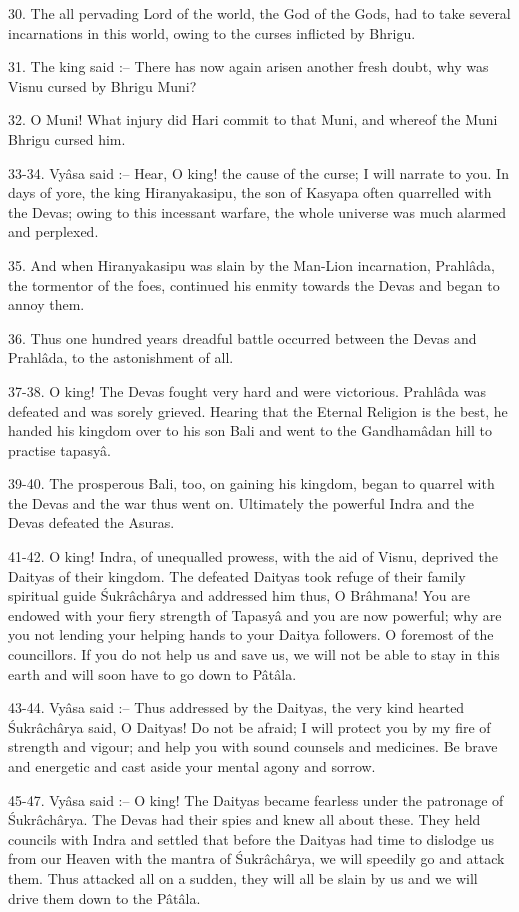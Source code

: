 30. The all pervading Lord of the world, the God of the Gods, had to take several incarnations in this world, owing to the curses inflicted by Bhrigu.

31. The king said :-- There has now again arisen another fresh doubt, why was Visnu cursed by Bhrigu Muni?

32. O Muni! What injury did Hari commit to that Muni, and whereof the Muni Bhrigu cursed him.

33-34. Vy\^asa said :-- Hear, O king! the cause of the curse; I will narrate to you. In days of yore, the king Hiranyakasipu, the son of Kasyapa often quarrelled with the Devas; owing to this incessant warfare, the whole universe was much alarmed and perplexed.

35. And when Hiranyakasipu was slain by the Man-Lion incarnation, Prahl\^ada, the tormentor of the foes, continued his enmity towards the Devas and began to annoy them.

36. Thus one hundred years dreadful battle occurred between the Devas and Prahl\^ada, to the astonishment of all.

37-38. O king! The Devas fought very hard and were victorious. Prahl\^ada was defeated and was sorely grieved. Hearing that the Eternal Religion is the best, he handed his kingdom over to his son Bali and went to the Gandham\^adan hill to practise tapasy\^a.

39-40. The prosperous Bali, too, on gaining his kingdom, began to quarrel with the Devas and the war thus went on. Ultimately the powerful Indra and the Devas defeated the Asuras.

41-42. O king! Indra, of unequalled prowess, with the aid of Visnu, deprived the Daityas of their kingdom. The defeated Daityas took refuge of their family spiritual guide \'Sukr\^ach\^arya and addressed him thus, O Br\^ahmana! You are endowed with your fiery strength of Tapasy\^a and you are now powerful; why are you not lending your helping hands to your Daitya followers. O foremost of the councillors. If you do not help us and save us, we will not be able to stay in this earth and will soon have to go down to P\^at\^ala.

43-44. Vy\^asa said :-- Thus addressed by the Daityas, the very kind hearted \'Sukr\^ach\^arya said, O Daityas! Do not be afraid; I will protect you by my fire of strength and vigour; and help you with sound counsels and medicines. Be brave and energetic and cast aside your mental agony and sorrow.

45-47. Vy\^asa said :-- O king! The Daityas became fearless under the patronage of \'Sukr\^ach\^arya. The Devas had their spies and knew all about these. They held councils with Indra and settled that before the Daityas had time to dislodge us from our Heaven with the mantra of \'Sukr\^ach\^arya, we will speedily go and attack them. Thus attacked all on a sudden, they will all be slain by us and we will drive them down to the P\^at\^ala.

